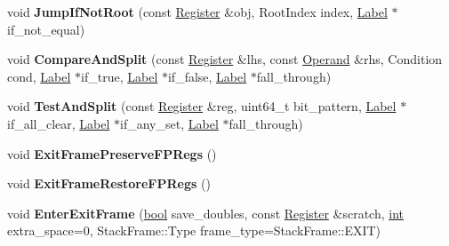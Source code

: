 \begin{DoxyCompactItemize}
\item 
\mbox{\label{classv8_1_1internal_1_1MacroAssembler_af32a86e01e6c46c33fa5efd49bf283bf}} 
void {\bfseries Jump\+If\+Not\+Root} (const \mbox{\hyperlink{classv8_1_1internal_1_1Register}{Register}} \&obj, Root\+Index index, \mbox{\hyperlink{classv8_1_1internal_1_1Label}{Label}} $\ast$if\+\_\+not\+\_\+equal)
\item 
\mbox{\label{classv8_1_1internal_1_1MacroAssembler_ab2b15b5192bc2d9dfd31c95cb3161ba3}} 
void {\bfseries Compare\+And\+Split} (const \mbox{\hyperlink{classv8_1_1internal_1_1Register}{Register}} \&lhs, const \mbox{\hyperlink{classv8_1_1internal_1_1Operand}{Operand}} \&rhs, Condition cond, \mbox{\hyperlink{classv8_1_1internal_1_1Label}{Label}} $\ast$if\+\_\+true, \mbox{\hyperlink{classv8_1_1internal_1_1Label}{Label}} $\ast$if\+\_\+false, \mbox{\hyperlink{classv8_1_1internal_1_1Label}{Label}} $\ast$fall\+\_\+through)
\item 
\mbox{\label{classv8_1_1internal_1_1MacroAssembler_ae7c687613af83c9d3b9324687bcb8b24}} 
void {\bfseries Test\+And\+Split} (const \mbox{\hyperlink{classv8_1_1internal_1_1Register}{Register}} \&reg, uint64\+\_\+t bit\+\_\+pattern, \mbox{\hyperlink{classv8_1_1internal_1_1Label}{Label}} $\ast$if\+\_\+all\+\_\+clear, \mbox{\hyperlink{classv8_1_1internal_1_1Label}{Label}} $\ast$if\+\_\+any\+\_\+set, \mbox{\hyperlink{classv8_1_1internal_1_1Label}{Label}} $\ast$fall\+\_\+through)
\item 
\mbox{\label{classv8_1_1internal_1_1MacroAssembler_a1f35c2b77eafcd6675c97ed619446a8a}} 
void {\bfseries Exit\+Frame\+Preserve\+F\+P\+Regs} ()
\item 
\mbox{\label{classv8_1_1internal_1_1MacroAssembler_a07d9b79e33a013b38b8a9f3829280285}} 
void {\bfseries Exit\+Frame\+Restore\+F\+P\+Regs} ()
\item 
\mbox{\label{classv8_1_1internal_1_1MacroAssembler_adff31f9129443d189e0c4079db033303}} 
void {\bfseries Enter\+Exit\+Frame} (\mbox{\hyperlink{classbool}{bool}} save\+\_\+doubles, const \mbox{\hyperlink{classv8_1_1internal_1_1Register}{Register}} \&scratch, \mbox{\hyperlink{classint}{int}} extra\+\_\+space=0, Stack\+Frame\+::\+Type frame\+\_\+type=Stack\+Frame\+::\+E\+X\+IT)

\end{DoxyCompactItemize}
